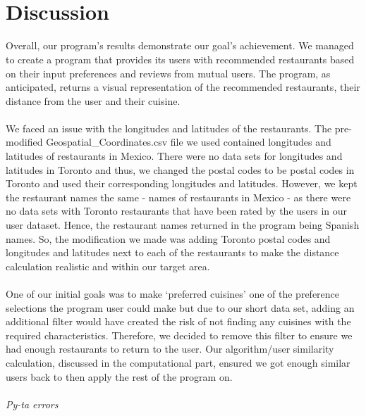 \documentclass{article}
\begin{document}
\\\\

\section{Discussion}

Overall, our program’s results demonstrate our goal’s achievement. We managed to create a program that provides its users with recommended restaurants based on their input preferences and reviews from mutual users. The program, as anticipated, returns a visual representation of the recommended restaurants, their distance from the user and their cuisine. 
\\\\

We faced an issue with the longitudes and latitudes of the restaurants. The pre-modified Geospatial\_Coordinates.csv file we used contained longitudes and latitudes of restaurants in Mexico. There were no data sets for longitudes and latitudes in Toronto and thus, we changed the postal codes to be postal codes in Toronto and used their corresponding longitudes and latitudes. However, we kept the restaurant names the same - names of restaurants in Mexico - as there were no data sets with Toronto restaurants that have been rated by the users in our user dataset. Hence, the restaurant names returned in the program being Spanish names. So, the modification we made was adding Toronto postal codes and longitudes and latitudes next to each of the restaurants to make the distance calculation realistic and within our target area. 
\\\\

One of our initial goals was to make ‘preferred cuisines’ one of the preference selections the program user could make but due to our short data set, adding an additional filter would have created the risk of not finding any cuisines with the required characteristics. Therefore, we decided to remove this filter to ensure we had enough restaurants to return to the user. Our algorithm/user similarity calculation, discussed in the computational part, ensured we got enough similar users back to then apply the rest of the program on. 
\\\\

\textit{Py-ta errors}
\\\\
\end{document}
